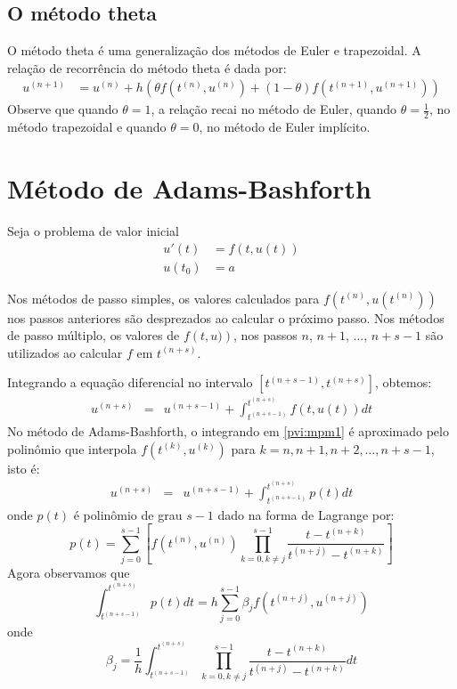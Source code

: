 \subsection{O método theta}
O método theta é uma generalização dos métodos de Euler e trapezoidal. A relação de recorrência do método theta é dada por:
\begin{eqnarray}
  u^{(n+1)} &= u^{(n)} +  h (\theta f(t^{(n)},u^{(n)})+(1-\theta )f(t^{(n+1)},u^{(n+1)}))
\end{eqnarray}
Observe que quando $\theta =1$, a relação recai no método de Euler, quando $\theta =\frac{1}{2}$, no método trapezoidal e quando $\theta=0$, no método de Euler implícito.





\section{Método de Adams-Bashforth}\label{pvi:Adams_Bashforth}
Seja o problema de valor inicial
\begin{eqnarray}
  u'(t) &= f(t,u(t)) \\
  u(t_0) &= a
\end{eqnarray}

Nos métodos de passo simples, os valores calculados para $f\left(t^{(n)},u(t^{(n)})\right)$ nos passos anteriores são desprezados ao calcular o próximo passo. Nos métodos de passo múltiplo, os valores de $f\left(t,u)\right)$, nos passos $n$, $n+1$, ..., $n+s-1$ são utilizados ao calcular $f$ em $t^{(n+s)}$.

Integrando a equação diferencial no intervalo $[t^{(n+s-1)},t^{(n+s)}]$, obtemos:
\begin{eqnarray}\label{pvi:mpm1}
  u^{(n+s)}  &=& u^{(n+s-1)}  + \int_{t^{(n+s-1)}}^{t^{(n+s)}} f(t,u(t)) dt
\end{eqnarray}
No método de Adams-Bashforth, o integrando em \eqref{pvi:mpm1} é aproximado pelo polinômio que interpola $f(t^{(k)},u^{(k)})$ para $k = n, n+1, n+2, \ldots, n+s-1$, isto é:
\begin{eqnarray*}%
  u^{(n+s)}  &=& u^{(n+s-1)}  + \int_{t^{(n+s-1)}}^{t^{(n+s)}} p(t) dt
\end{eqnarray*}
onde $p(t)$ é polinômio de grau $s-1$ dado na forma de Lagrange por:
$$p(t)=\sum_{j=0}^{s-1}\left[f(t^{(n)},u^{(n)}) \prod_{k=0,k\neq j}^{s-1} \frac{t-t^{(n+k)}}{t^{(n+j)}-t^{(n+k)}}\right]$$
Agora observamos que
$$\int _{t^{(n+s-1)}}^{t^{(n+s)}} p(t) dt=h\sum_{j=0}^{s-1}\beta_j f(t^{(n+j)},u^{(n+j)})$$
onde 
\begin{equation}\label{pvi:betaj}
\beta_j= \frac{1}{h}\int_{t^{(n+s-1)}}^{t^{(n+s)}} \prod_{k=0,k\neq j}^{s-1} \frac{t-t^{(n+k)}}{t^{(n+j)}-t^{(n+k)}}dt
\end{equation}

